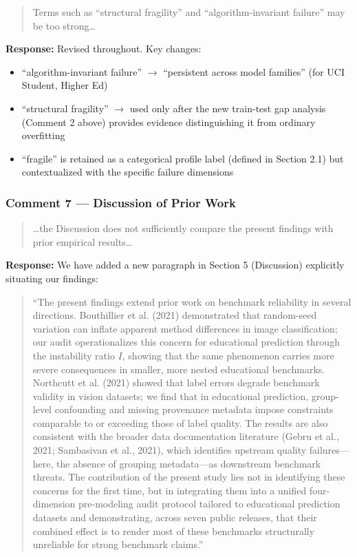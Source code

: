\documentclass[12pt,a4paper]{article}
\begin{document}
\begin{quote}
Terms such as ``structural fragility'' and ``algorithm-invariant failure'' may be too strong\ldots
\end{quote}

\textbf{Response:} Revised throughout. Key changes:
\begin{itemize}[nosep]
\item ``algorithm-invariant failure'' $\rightarrow$ ``persistent across model families'' (for UCI Student, Higher Ed)
\item ``structural fragility'' $\rightarrow$ used only after the new train-test gap analysis (Comment 2 above) provides evidence distinguishing it from ordinary overfitting
\item ``fragile'' is retained as a categorical profile label (defined in Section 2.1) but contextualized with the specific failure dimensions
\end{itemize}

\subsubsection*{Comment 7 --- Discussion of Prior Work}

\begin{quote}
\ldots the Discussion does not sufficiently compare the present findings with prior empirical results\ldots
\end{quote}

\textbf{Response:} We have added a new paragraph in Section 5 (Discussion) explicitly situating our findings:

\begin{quote}
``The present findings extend prior work on benchmark reliability in several directions. Bouthillier et al. (2021) demonstrated that random-seed variation can inflate apparent method differences in image classification; our audit operationalizes this concern for educational prediction through the instability ratio $I$, showing that the same phenomenon carries more severe consequences in smaller, more nested educational benchmarks. Northcutt et al. (2021) showed that label errors degrade benchmark validity in vision datasets; we find that in educational prediction, group-level confounding and missing provenance metadata impose constraints comparable to or exceeding those of label quality. The results are also consistent with the broader data documentation literature (Gebru et al., 2021; Sambasivan et al., 2021), which identifies upstream quality failures---here, the absence of grouping metadata---as downstream benchmark threats. The contribution of the present study lies not in identifying these concerns for the first time, but in integrating them into a unified four-dimension pre-modeling audit protocol tailored to educational prediction datasets and demonstrating, across seven public releases, that their combined effect is to render most of these benchmarks structurally unreliable for strong benchmark claims.''
\end{quote}
\end{document}
